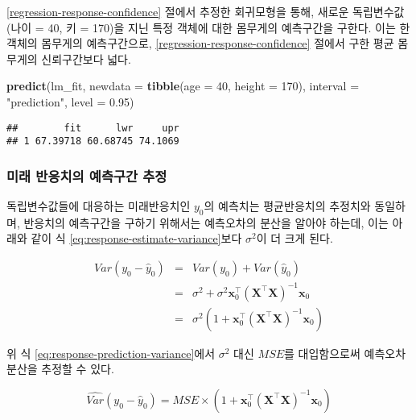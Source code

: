 \documentclass[]{book}
\newenvironment{Shaded}{\begin{snugshade}}{\end{snugshade}}
\newcommand{\DataTypeTok}[1]{\textcolor[rgb]{0.13,0.29,0.53}{#1}}
\newcommand{\DecValTok}[1]{\textcolor[rgb]{0.00,0.00,0.81}{#1}}
\newcommand{\FloatTok}[1]{\textcolor[rgb]{0.00,0.00,0.81}{#1}}
\newcommand{\KeywordTok}[1]{\textcolor[rgb]{0.13,0.29,0.53}{\textbf{#1}}}
\newcommand{\NormalTok}[1]{#1}
\newcommand{\StringTok}[1]{\textcolor[rgb]{0.31,0.60,0.02}{#1}}
\begin{document}
\ref{regression-response-confidence} 절에서 추정한 회귀모형을 통해, 새로운 독립변수값(나이 = 40, 키 = 170)을 지닌 특정 객체에 대한 몸무게의 예측구간을 구한다. 이는 한 객체의 몸무게의 예측구간으로, \ref{regression-response-confidence} 절에서 구한 평균 몸무게의 신뢰구간보다 넓다.

\begin{Shaded}
\begin{Highlighting}[]
\KeywordTok{predict}\NormalTok{(lm_fit, }\DataTypeTok{newdata =} \KeywordTok{tibble}\NormalTok{(}\DataTypeTok{age =} \DecValTok{40}\NormalTok{, }\DataTypeTok{height =} \DecValTok{170}\NormalTok{),}
        \DataTypeTok{interval =} \StringTok{"prediction"}\NormalTok{, }\DataTypeTok{level =} \FloatTok{0.95}\NormalTok{)}
\end{Highlighting}
\end{Shaded}

\begin{verbatim}
##        fit      lwr     upr
## 1 67.39718 60.68745 74.1069
\end{verbatim}

\hypertarget{regression-response-prediction-interval}{%
\subsubsection{미래 반응치의 예측구간 추정}\label{regression-response-prediction-interval}}

독립변수값들에 대응하는 미래반응치인 \(y_0\)의 예측치는 평균반응치의 추정치와 동일하며, 반응치의 예측구간을 구하기 위해서는 예측오차의 분산을 알아야 하는데, 이는 아래와 같이 식 \eqref{eq:response-estimate-variance}보다 \(\sigma^2\)이 더 크게 된다.

\begin{eqnarray}
Var(y_0 - \hat{y}_0) &=& Var(y_0) + Var(\hat{y}_0)\\
&=& \sigma^2 + \sigma^2 \mathbf{x}_0^\top \left(\mathbf{X}^\top \mathbf{X}\right)^{-1} \mathbf{x}_0 \\
&=& \sigma^2 \left( 1 + \mathbf{x}_0^\top \left(\mathbf{X}^\top \mathbf{X}\right)^{-1} \mathbf{x}_0 \right)
\label{eq:response-prediction-variance}
\end{eqnarray}

위 식 \eqref{eq:response-prediction-variance}에서 \(\sigma^2\) 대신 \(MSE\)를 대입함으로써 예측오차 분산을 추정할 수 있다.

\begin{equation}
\hat{Var}(y_0 - \hat{y}_0) = MSE \times \left( 1 + \mathbf{x}_0^\top \left(\mathbf{X}^\top \mathbf{X}\right)^{-1} \mathbf{x}_0 \right)
\label{eq:response-prediction-variance-est}
\end{equation}
\end{document}
